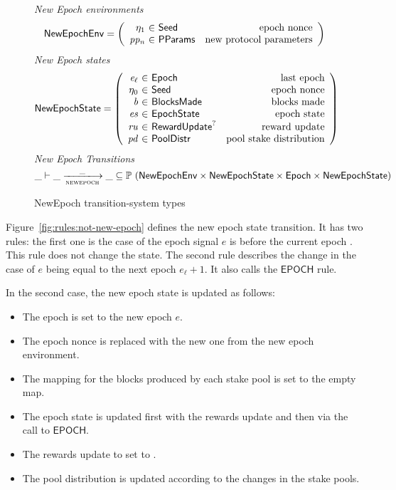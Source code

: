 \begin{figure}
  \emph{New Epoch environments}
  \begin{equation*}
    \NewEpochEnv =
    \left(
      \begin{array}{r@{~\in~}lr}
        \eta_1 & \Seed & \text{epoch nonce} \\
        \var{pp_n} & \PParams & \text{new protocol parameters}
      \end{array}
    \right)
  \end{equation*}
  \emph{New Epoch states}
  \begin{equation*}
    \NewEpochState =
    \left(
      \begin{array}{r@{~\in~}lr}
        \var{e_\ell} & \Epoch & \text{last epoch} \\
        \eta_0 & \Seed & \text{epoch nonce} \\
        \var{b} & \BlocksMade & \text{blocks made} \\
        \var{es} & \EpochState & \text{epoch state} \\
        \var{ru} & \RewardUpdate^? & \text{reward update} \\
        \var{pd} & \PoolDistr & \text{pool stake distribution} \\
      \end{array}
    \right)
  \end{equation*}
  \emph{New Epoch Transitions}
  \begin{equation*}
    \_ \vdash \var{\_} \trans{newepoch}{\_} \var{\_} \subseteq
    \powerset (\NewEpochEnv \times \NewEpochState \times \Epoch \times \NewEpochState)
  \end{equation*}
  \caption{NewEpoch transition-system types}
  \label{fig:ts-types:newepoch}
\end{figure}

Figure~\ref{fig:rules:not-new-epoch} defines the new epoch state transition. It
has two rules: the first one is the case of the epoch signal $e$ is before the
current epoch . This rule does not change the state. The second rule
describes the change in the case of $e$ being equal to the next epoch
$e_\ell+ 1$. It also calls the $\mathsf{EPOCH}$ rule.

In the second case, the new epoch state is updated as follows:

\begin{itemize}
\item The epoch is set to the new epoch $e$.
\item The epoch nonce is replaced with the new one from the new epoch
  environment.
\item The mapping for the blocks produced by each stake pool is set to the empty
  map.
\item The epoch state is updated first with the rewards update  and then
  via the call to $\mathsf{EPOCH}$.
\item The rewards update to set to \Nothing.
\item The pool distribution is updated according to the changes in the stake
  pools.
\end{itemize}

